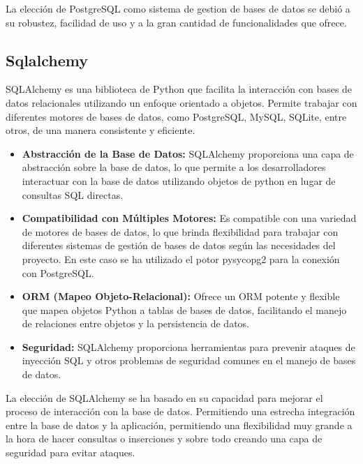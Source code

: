 La elección de PostgreSQL como sistema de gestion de bases de datos se debió a su robustez, facilidad de uso y a la gran cantidad de funcionalidades que ofrece.

\subsection{Sqlalchemy}
SQLAlchemy es una biblioteca de Python que facilita la interacción con bases de datos relacionales utilizando un enfoque orientado a objetos. Permite trabajar con diferentes motores de bases de datos, como PostgreSQL, MySQL, SQLite, entre otros, de una manera consistente y eficiente.

\begin{itemize}
	\item \textbf{Abstracción de la Base de Datos:} SQLAlchemy proporciona una capa de abstracción sobre la base de datos, lo que permite a los desarrolladores interactuar con la base de datos utilizando objetos de python en lugar de consultas SQL directas.
	\item \textbf{Compatibilidad con Múltiples Motores:} Es compatible con una variedad de motores de bases de datos, lo que brinda flexibilidad para trabajar con diferentes sistemas de gestión de bases de datos según las necesidades del proyecto. En este caso se ha utilizado el potor pysycopg2 para la conexión con PostgreSQL.
	\item \textbf{ORM (Mapeo Objeto-Relacional):} Ofrece un ORM potente y flexible que mapea objetos Python a tablas de bases de datos, facilitando el manejo de relaciones entre objetos y la persistencia de datos.
	\item \textbf{Seguridad:} SQLAlchemy proporciona herramientas para prevenir ataques de inyección SQL y otros problemas de seguridad comunes en el manejo de bases de datos.
\end{itemize}

La elección de SQLAlchemy se ha basado en su capacidad para mejorar el proceso de interacción con la base de datos. Permitiendo una estrecha integración entre la base de datos y la aplicación, permitiendo una flexibilidad muy grande a la hora de hacer consultas o inserciones y sobre todo creando una capa de seguridad para evitar ataques.
